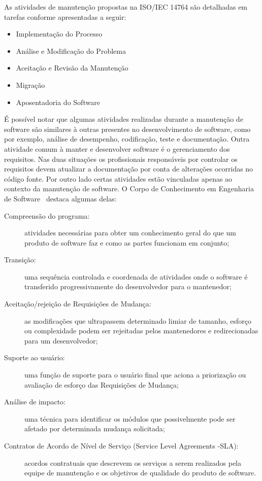 As atividades de manutenção propostas na ISO/IEC 14764 são detalhadas em tarefas
conforme apresentadas a seguir:

\begin{itemize}
   	\item Implementação do Processo
   	\item Análise e Modificação do
		Problema
	\item Aceitação e Revisão da Manutenção
   	\item Migração
   	\item Aposentadoria do Software
\end{itemize}

É possível notar que algumas atividades realizadas durante a manutenção de
software são similares à outras presentes no desenvolvimento de software, como
por exemplo, análise de desempenho, codificação, teste e documentação. Outra
atividade comum à manter e desenvolver software é o gerenciamento dos
requisitos. Nas duas situações os profissionais responsáveis por controlar os
requisitos devem atualizar a do\-cu\-men\-ta\-ção  por conta de alterações
ocorridas no código fonte. Por outro lado certas atividades estão vinculadas
apenas ao contexto da manutenção de software. O Corpo de Conhecimento em
Engenharia de Software~\cite{4425813} destaca algumas delas:

\begin{description}
	\item[Compreensão do programa:] atividades necessárias para obter um
		conhecimento geral do que um produto de software faz e como as partes
		funcionam em conjunto;
	\item[Transição:] uma sequência controlada e coordenada de atividades onde o
		software é transferido progressivamente do desenvolvedor para o
		mantenedor;
	\item[Aceitação/rejeição de Requisições de Mudança:] as modificações
		que ultrapassem determinado limiar de tamanho, esforço ou complexidade
		podem ser rejeitadas pelos mantenedores e redirecionadas para um
		desenvolvedor;
	\item[Suporte ao usuário:] uma função de suporte para o usuário final que
		aciona a priorização ou avaliação de esforço das Requisições
		de Mudança;
	\item[Análise de impacto:] uma técnica para identificar os módulos que
		possivelmente pode ser afetado por determinada mudança solicitada;
	\item[Contratos de Acordo de Nível de Serviço (Service Level Agreements
		\@-\@ SLA):] acordos contratuais que descrevem os serviços a serem
		realizados pela equipe de manutenção e os objetivos de qualidade do
		produto de software.
\end{description}
\todoend


